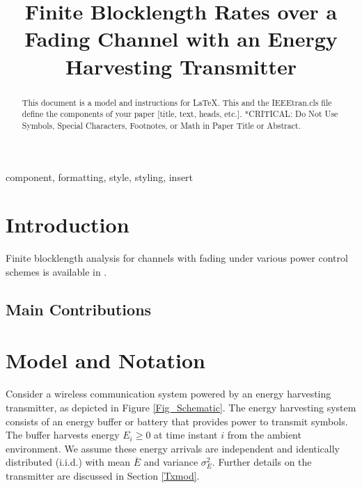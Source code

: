 \documentclass[conference]{IEEEtran}
\begin{document}
\title{Finite Blocklength Rates over a Fading Channel with an Energy Harvesting Transmitter\\
}

\author{
\and
{}
\and
{}
}

\maketitle

\begin{abstract}
This document is a model and instructions for \LaTeX.
This and the IEEEtran.cls file define the components of your paper [title, text, heads, etc.]. *CRITICAL: Do Not Use Symbols, Special Characters, Footnotes, 
or Math in Paper Title or Abstract.
\end{abstract}

\begin{IEEEkeywords}
component, formatting, style, styling, insert
\end{IEEEkeywords}

\section{Introduction}
Finite blocklength analysis for channels with fading under various power control schemes is available in \cite{deeks2018}.

\subsection{Main Contributions}
\section{Model and Notation}
Consider a wireless communication system powered by an energy harvesting transmitter, as depicted in Figure \ref{Fig_Schematic}. The energy harvesting system consists of an energy buffer or battery that provides power to transmit symbols. The buffer harvests energy $E_i\geq 0$ at time instant $i$ from the ambient environment. We assume these energy arrivals are independent and identically distributed (i.i.d.) with mean $\overline{E}$ and variance $\sigma_E^2$. Further details on the transmitter are discussed in Section \ref{Txmod}.
\end{document}
